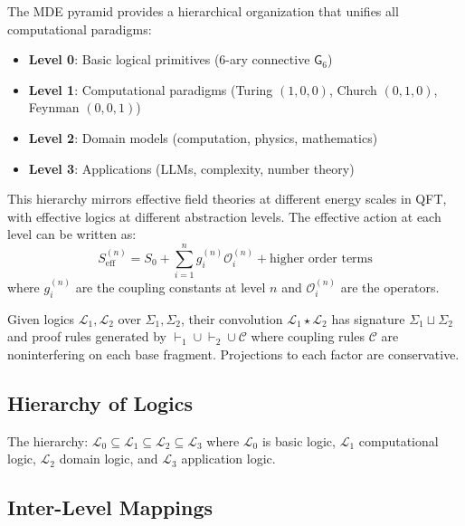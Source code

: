 \begin{definition}
\label{def:mde-pyramid}
The MDE pyramid provides a hierarchical organization that unifies all computational paradigms:
\begin{itemize}
\item \textbf{Level 0}: Basic logical primitives (6-ary connective $\mathsf{G}_6$)
\item \textbf{Level 1}: Computational paradigms (Turing $(1,0,0)$, Church $(0,1,0)$, Feynman $(0,0,1)$)
\item \textbf{Level 2}: Domain models (computation, physics, mathematics)
\item \textbf{Level 3}: Applications (LLMs, complexity, number theory)
\end{itemize}
\end{definition}

This hierarchy mirrors effective field theories at different energy scales in QFT, with effective logics at different abstraction levels. The effective action at each level can be written as:
\[
S_{\text{eff}}^{(n)} = S_0 + \sum_{i=1}^n g_i^{(n)} \mathcal{O}_i^{(n)} + \text{higher order terms}
\]
where $g_i^{(n)}$ are the coupling constants at level $n$ and $\mathcal{O}_i^{(n)}$ are the operators.

\begin{definition}[Convolution]
\label{def:convolution}
Given logics $\mathcal{L}_1,\mathcal{L}_2$ over $\Sigma_1,\Sigma_2$, their convolution
$\mathcal{L}_1\star\mathcal{L}_2$ has signature $\Sigma_1\sqcup\Sigma_2$ and proof rules
generated by $\vdash_1\cup\vdash_2\cup\mathcal{C}$ where coupling rules $\mathcal{C}$ are
noninterfering on each base fragment. Projections to each factor are conservative.
\end{definition}

\subsection{Hierarchy of Logics}

\begin{definition}
\label{def:hierarchy-logics}
The hierarchy: $\mathcal{L}_0 \subseteq \mathcal{L}_1 \subseteq \mathcal{L}_2 \subseteq \mathcal{L}_3$ where $\mathcal{L}_0$ is basic logic, $\mathcal{L}_1$ computational logic, $\mathcal{L}_2$ domain logic, and $\mathcal{L}_3$ application logic.
\end{definition}

\subsection{Inter-Level Mappings}

